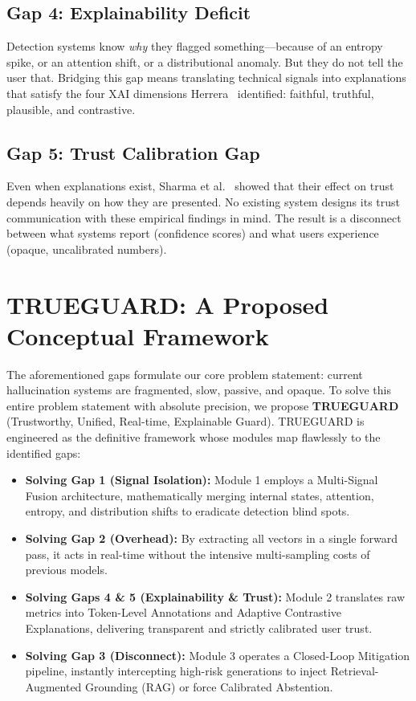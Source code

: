 \documentclass[journal]{IEEEtran}
\begin{document}
\subsection{Gap 4: Explainability Deficit}

Detection systems know \emph{why} they flagged something---because of an entropy spike, or an attention shift, or a distributional anomaly. But they do not tell the user that. Bridging this gap means translating technical signals into explanations that satisfy the four XAI dimensions Herrera~\cite{xai_survey} identified: faithful, truthful, plausible, and contrastive.

\subsection{Gap 5: Trust Calibration Gap}

Even when explanations exist, Sharma et al.~\cite{human_trust} showed that their effect on trust depends heavily on how they are presented. No existing system designs its trust communication with these empirical findings in mind. The result is a disconnect between what systems report (confidence scores) and what users experience (opaque, uncalibrated numbers).

\section{TRUEGUARD: A Proposed Conceptual Framework}

The aforementioned gaps formulate our core problem statement: current hallucination systems are fragmented, slow, passive, and opaque. To solve this entire problem statement with absolute precision, we propose \textbf{TRUEGUARD} (Trustworthy, Unified, Real-time, Explainable Guard). TRUEGUARD is engineered as the definitive framework whose modules map flawlessly to the identified gaps:

\begin{itemize}
\item \textbf{Solving Gap 1 (Signal Isolation):} Module 1 employs a Multi-Signal Fusion architecture, mathematically merging internal states, attention, entropy, and distribution shifts to eradicate detection blind spots.
\item \textbf{Solving Gap 2 (Overhead):} By extracting all vectors in a single forward pass, it acts in real-time without the intensive multi-sampling costs of previous models.
\item \textbf{Solving Gaps 4 \& 5 (Explainability \& Trust):} Module 2 translates raw metrics into Token-Level Annotations and Adaptive Contrastive Explanations, delivering transparent and strictly calibrated user trust.
\item \textbf{Solving Gap 3 (Disconnect):} Module 3 operates a Closed-Loop Mitigation pipeline, instantly intercepting high-risk generations to inject Retrieval-Augmented Grounding (RAG) or force Calibrated Abstention.
\end{itemize}
\end{document}
